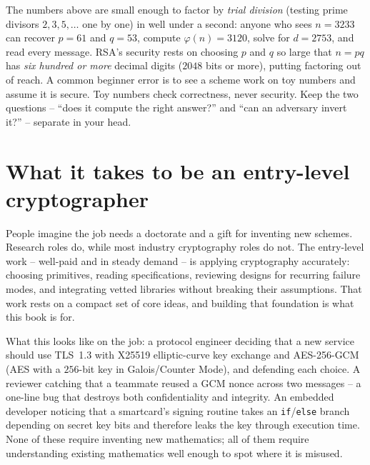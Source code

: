 \begin{trapbox}
The numbers above are small enough to factor by \emph{trial division} (testing prime divisors $2, 3, 5, \dots$ one by one) in well under a second: anyone who sees $n = 3233$ can recover $p = 61$ and $q = 53$, compute $\varphi(n) = 3120$, solve for $d = 2753$, and read every message. RSA's security rests on choosing $p$ and $q$ so large that $n = pq$ has \emph{six hundred or more} decimal digits ($2048$ bits or more), putting factoring out of reach. A common beginner error is to see a scheme work on toy numbers and assume it is secure. Toy numbers check correctness, never security. Keep the two questions -- ``does it compute the right answer?'' and ``can an adversary invert it?'' -- separate in your head.
\end{trapbox}

\section*{What it takes to be an entry-level cryptographer}

People imagine the job needs a doctorate and a gift for inventing new schemes. Research roles do, while most industry cryptography roles do not. The entry-level work -- well-paid and in steady demand -- is applying cryptography accurately: choosing primitives, reading specifications, reviewing designs for recurring failure modes, and integrating vetted libraries without breaking their assumptions. That work rests on a compact set of core ideas, and building that foundation is what this book is for.

\begin{applicationbox}
What this looks like on the job: a protocol engineer deciding that a new service should use TLS~1.3 with X25519 elliptic-curve key exchange and AES-256-GCM (AES with a $256$-bit key in Galois/Counter Mode), and defending each choice. A reviewer catching that a teammate reused a GCM nonce across two messages -- a one-line bug that destroys both confidentiality and integrity. An embedded developer noticing that a smartcard's signing routine takes an \texttt{if}/\texttt{else} branch depending on secret key bits and therefore leaks the key through execution time. None of these require inventing new mathematics; all of them require understanding existing mathematics well enough to spot where it is misused.
\end{applicationbox}

